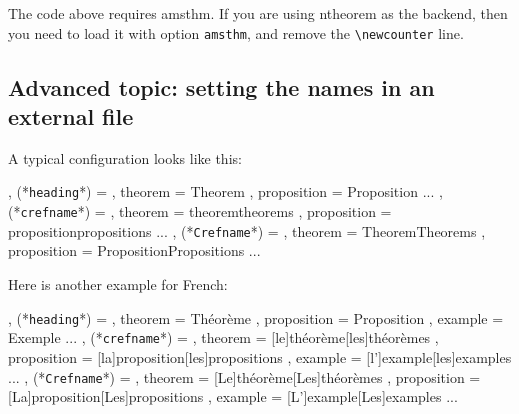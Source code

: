 \documentclass[classical]{einfart}
\newcommand{\packageoption}[1]{\texttt{\textcolor{code-option}{#1}}}
\newcommand{\commandoption}[1]{\texttt{\textcolor{code-keys}{#1}}}
\newenvironment{tip}[1][Tip]
  {%
    \LocallyStopLineNumbers%
    \begin{tcolorbox}[breakable,
        enhanced,
        width = \textwidth,
        colback = paper, colbacktitle = paper,
        colframe = gray!50, boxrule=0.2mm,
        coltitle = black,
        fonttitle = \sffamily,
        attach boxed title to top left = {yshift=-\tcboxedtitleheight/2, xshift=.5cm},
        boxed title style = {boxrule=0pt, colframe=paper},
        before skip = 3mm,
        after skip = 3mm,
        top = 2.5mm,
        bottom = 1.5mm,
        title={\scshape\sffamily #1}]%
  }
  {%
    \end{tcolorbox}%
    \ResumeLineNumbers%
  }
\begin{document}
\begin{tip}[Attention]
    The code above requires \textsf{amsthm}. If you are using \textsf{ntheorem} as the backend, then you need to load it with option \packageoption{amsthm}, and remove the \lstinline|\newcounter| line.
\end{tip}

\medskip
\subsection{Advanced topic: setting the names in an external file}

A typical configuration looks like this:

\begin{code}
  {
    , (*\commandoption{heading}*) =   {
                     , theorem        = Theorem
                     , proposition    = Proposition
                     ...
                   }
    , (*\commandoption{crefname}*) =  {
                     , theorem        = {theorem}{theorems}
                     , proposition    = {proposition}{propositions}
                     ...
                   }
    , (*\commandoption{Crefname}*) =  {
                     , theorem        = {Theorem}{Theorems}
                     , proposition    = {Proposition}{Propositions}
                     ...
                   }
  }
\end{code}

Here is another example for French:

\begin{code}
  {
    , (*\commandoption{heading}*) =   {
                     , theorem        = Théorème
                     , proposition    = Proposition
                     , example        = Exemple
                     ...
                   }
    , (*\commandoption{crefname}*) =  {
                     , theorem        = [le]{théorème}[les]{théorèmes}
                     , proposition    = [la]{proposition}[les]{propositions}
                     , example        = [l']{example}[les]{examples}
                     ...
                   }
    , (*\commandoption{Crefname}*) =  {
                     , theorem        = [Le]{théorème}[Les]{théorèmes}
                     , proposition    = [La]{proposition}[Les]{propositions}
                     , example        = [L']{example}[Les]{examples}
                     ...
                   }
  }
\end{code}
\end{document}

